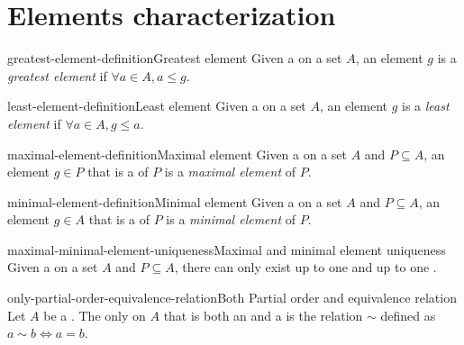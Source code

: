 \documentclass[preview]{standalone}
\begin{document}
\section{Elements characterization}

\begin{snippetdefinition}{greatest-element-definition}{Greatest element}
    Given a \partialorder on a set \(A\), an element \(g\) is a \textit{greatest element}
    if \(\forall a\in A, a \leq g\).
\end{snippetdefinition}

\begin{snippetdefinition}{least-element-definition}{Least element}
    Given a \partialorder on a set \(A\), an element \(g\) is a \textit{least element}
    if \(\forall a\in A, g \leq a\).
\end{snippetdefinition}

\begin{snippetdefinition}{maximal-element-definition}{Maximal element}
    Given a \partialorder on a set \(A\) and \(P\subseteq A\), an element \(g\in P\) that is
    a  of \(P\) is a \textit{maximal element} of \(P\).
\end{snippetdefinition}

\begin{snippetdefinition}{minimal-element-definition}{Minimal element}
    Given a \partialorder on a set \(A\) and \(P\subseteq A\), an element \(g\in A\) that is
    a  of \(P\) is a \textit{minimal element} of \(P\).
\end{snippetdefinition}

\begin{snippetcorollary}{maximal-minimal-element-uniqueness}{Maximal and minimal element uniqueness}
    Given a \partialorder on a set \(A\) and \(P\subseteq A\), there can only exist
    up to one  and up to one .
\end{snippetcorollary}


\begin{snippettheorem}{only-partial-order-equivalence-relation}{Both Partial order and equivalence relation}
    Let \(A\) be a \set. The only \binrelation on \(A\) that is both an
    \equivrelation and a \partialorder is the relation \(\sim\) defined as
    \(a \sim b \iff a = b\).
\end{snippettheorem}
\end{document}
